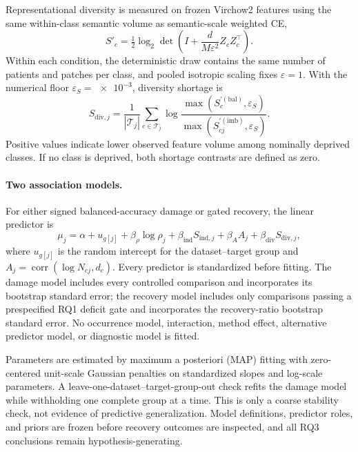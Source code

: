 \documentclass[11pt]{article}
\begin{document}
Representational diversity is measured on frozen Virchow2 features using the same within-class semantic volume as semantic-scale weighted CE,
\begin{equation}
  S'_c=\tfrac{1}{2}\log_2\det\!\left(I+\frac{d}{M\varepsilon^2}Z_cZ_c^\top\right).
  \label{eq:rq3-semantic-volume}
\end{equation}
\noindent Within each condition, the deterministic draw contains the same number of patients and patches per class, and pooled isotropic scaling fixes $\varepsilon=1$. With the numerical floor $\varepsilon_S=\num{e-3}$, diversity shortage is
\begin{equation}
  S_{\mathrm{div},j}=\frac{1}{|\mathcal T_j|}
  \sum_{c\in\mathcal T_j}
  \log\frac{\max(S_c^{\prime(\mathrm{bal})},\varepsilon_S)}
           {\max(S_{cj}^{\prime(\mathrm{imb})},\varepsilon_S)}.
  \label{eq:rq3-diversity-shortage}
\end{equation}
\noindent Positive values indicate lower observed feature volume among nominally deprived classes. If no class is deprived, both shortage contrasts are defined as zero.

\paragraph{Two association models.}
For either signed balanced-accuracy damage or gated recovery, the linear predictor is
\begin{equation}
  \mu_j=\alpha+u_{g[j]}+\beta_\rho\log\rho_j
  +\beta_{\mathrm{ind}}S_{\mathrm{ind},j}
  +\beta_A A_j+\beta_{\mathrm{div}}S_{\mathrm{div},j},
  \label{eq:rq3-model}
\end{equation}
\noindent where $u_{g[j]}$ is the random intercept for the dataset--target group and $A_j=\operatorname{corr}(\log N_{cj},d_c)$. Every predictor is standardized before fitting. The damage model includes every controlled comparison and incorporates its bootstrap standard error; the recovery model includes only comparisons passing a prespecified RQ1 deficit gate and incorporates the recovery-ratio bootstrap standard error. No occurrence model, interaction, method effect, alternative predictor model, or diagnostic model is fitted.

Parameters are estimated by maximum a posteriori (MAP) fitting with zero-centered unit-scale Gaussian penalties on standardized slopes and log-scale parameters. A leave-one-dataset--target-group-out check refits the damage model while withholding one complete group at a time. This is only a coarse stability check, not evidence of predictive generalization. Model definitions, predictor roles, and priors are frozen before recovery outcomes are inspected, and all RQ3 conclusions remain hypothesis-generating.
\end{document}
